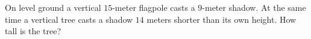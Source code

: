 On level ground a vertical $15$-meter flagpole casts a $9$-meter shadow. At the same time a vertical tree casts a shadow $14$ meters shorter than its own height. How tall is the tree?
